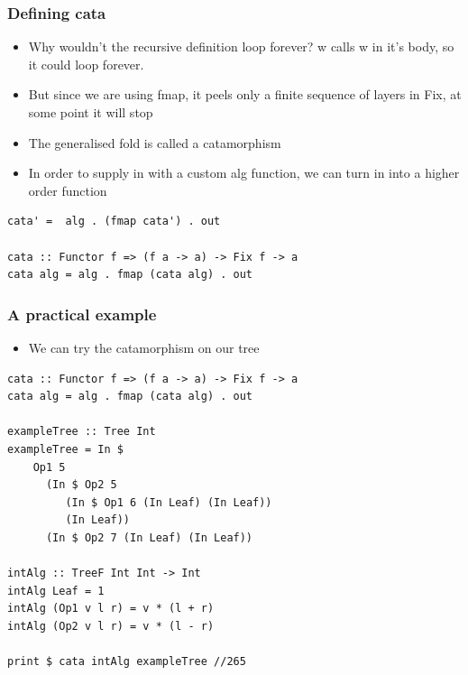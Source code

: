 \documentclass[10pt]{beamer}
\begin{document}
\begin{frame}[fragile]
\frametitle{Defining cata}

\begin{itemize}
\item Why wouldn't the recursive definition loop forever? w calls w in it's body, so it could loop forever. 
\item But since we are using fmap, it peels only a finite sequence of layers in Fix, at some point it will stop
\item The generalised fold is called a catamorphism
\item In order to supply in with a custom alg function, we can turn in into a higher order function	
\end{itemize}

\begin{lstlisting}
cata' =  alg . (fmap cata') . out

cata :: Functor f => (f a -> a) -> Fix f -> a
cata alg = alg . fmap (cata alg) . out
\end{lstlisting}

\end{frame}



\begin{frame}[fragile]
\frametitle{A practical example}

\begin{itemize}
\item We can try the catamorphism on our tree
\end{itemize}

\begin{lstlisting}
cata :: Functor f => (f a -> a) -> Fix f -> a
cata alg = alg . fmap (cata alg) . out

exampleTree :: Tree Int
exampleTree = In $ 
    Op1 5 
      (In $ Op2 5 
         (In $ Op1 6 (In Leaf) (In Leaf))
         (In Leaf)) 
      (In $ Op2 7 (In Leaf) (In Leaf))

intAlg :: TreeF Int Int -> Int
intAlg Leaf = 1
intAlg (Op1 v l r) = v * (l + r)
intAlg (Op2 v l r) = v * (l - r)

print $ cata intAlg exampleTree //265

\end{lstlisting}

\end{frame}
\end{document}
